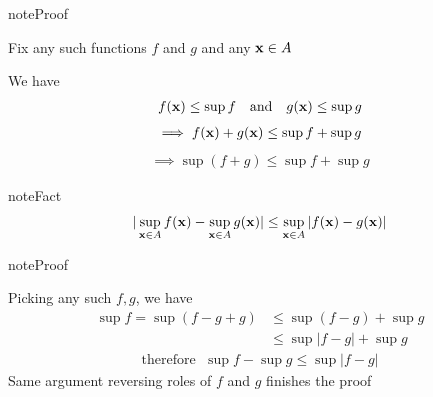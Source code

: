 \documentclass[letterpaper,10pt,english]{jupyterBook}
\begin{document}
\begin{sphinxadmonition}{note}{Proof}

\sphinxAtStartPar
Fix any such functions \(f\) and \(g\) and any \({\bf x} \in A\)

\sphinxAtStartPar
We have
\begin{equation*}
\begin{split}
%
f({\bf x}) \leq \sup f
\quad \text{and} \quad 
g({\bf x}) \leq \sup g
%
\end{split}
\end{equation*}\begin{equation*}
\begin{split}
%
\implies
f({\bf x}) + g({\bf x}) \leq \sup f + \sup g
%
\end{split}
\end{equation*}\begin{equation*}
\begin{split}
%
\implies
\sup (f + g) \leq \sup f + \sup g
%
\end{split}
\end{equation*}\end{sphinxadmonition}

\begin{sphinxadmonition}{note}{Fact}
\begin{equation*}
\begin{split}
%
| \sup_{{\bf x} \in A} f({\bf x}) - \sup_{{\bf x} \in A} g({\bf x}) | \leq
\sup_{{\bf x} \in A} |f({\bf x}) - g({\bf x})|
%
\end{split}
\end{equation*}\end{sphinxadmonition}

\begin{sphinxadmonition}{note}{Proof}

\sphinxAtStartPar
Picking any such \(f, g\), we have
\begin{equation*}
\begin{split}
%
\sup f = \sup (f - g + g) 
& \leq \sup (f - g) + \sup g
\\
& \leq \sup | f - g | + \sup g
%
\end{split}
\end{equation*}\begin{equation*}
\begin{split}
%
\text{therefore } \; \sup f - \sup g \leq \sup | f - g |
%
\end{split}
\end{equation*}
\sphinxAtStartPar
Same argument reversing roles of \(f\) and \(g\) finishes the proof
\end{sphinxadmonition}
\end{document}
